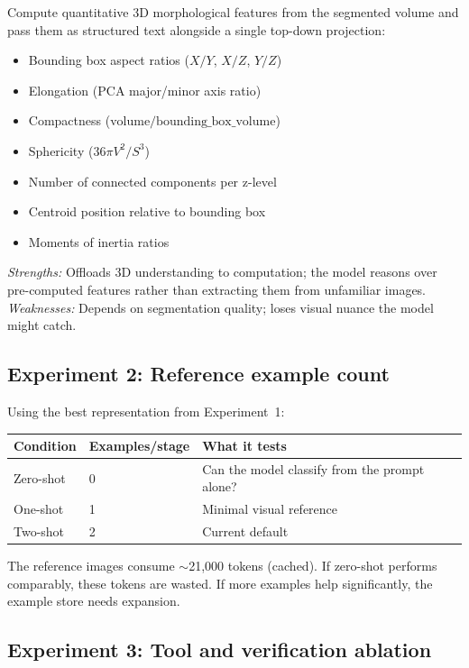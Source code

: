 \documentclass[11pt, a4paper]{article}
\begin{document}
Compute quantitative 3D morphological features from the segmented volume and pass
them as structured text alongside a single top-down projection:

\begin{itemize}[itemsep=1pt]
  \item Bounding box aspect ratios ($X/Y$, $X/Z$, $Y/Z$)
  \item Elongation (PCA major/minor axis ratio)
  \item Compactness ($\text{volume} / \text{bounding\_box\_volume}$)
  \item Sphericity ($36\pi V^2 / S^3$)
  \item Number of connected components per z-level
  \item Centroid position relative to bounding box
  \item Moments of inertia ratios
\end{itemize}

\textit{Strengths:} Offloads 3D understanding to computation; the model reasons over
pre-computed features rather than extracting them from unfamiliar images.\\
\textit{Weaknesses:} Depends on segmentation quality; loses visual nuance the model
might catch.

\subsection{Experiment 2: Reference example count}

Using the best representation from Experiment~1:

\begin{center}
\small
\begin{tabular}{@{}lll@{}}
\toprule
\textbf{Condition} & \textbf{Examples/stage} & \textbf{What it tests} \\
\midrule
Zero-shot  & 0 & Can the model classify from the prompt alone? \\
One-shot   & 1 & Minimal visual reference \\
Two-shot   & 2 & Current default \\
\bottomrule
\end{tabular}
\end{center}

The reference images consume $\sim$21{,}000 tokens (cached). If zero-shot
performs comparably, these tokens are wasted. If more examples help significantly,
the example store needs expansion.

\subsection{Experiment 3: Tool and verification ablation}
\end{document}
